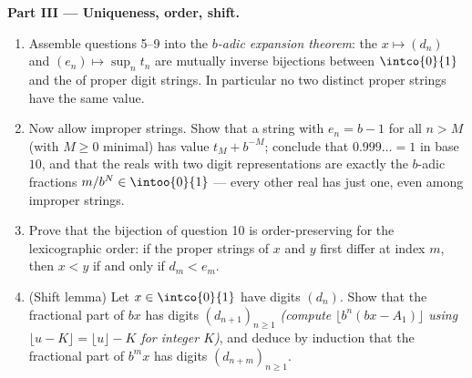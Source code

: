 \begin{problem}
\medskip
\noindent\textbf{Part III --- Uniqueness, order, shift.}
\begin{enumerate}[resume]
  \item Assemble questions 5--9 into the \emph{$b$-adic expansion
        theorem}: the  $x \mapsto (d_n)$ and $(e_n) \mapsto
        \sup_n t_n$ are mutually inverse bijections between
        $\intco{0}{1}$ and the  of proper digit strings. In
        particular no two distinct proper strings have the same
        value.
  \item Now allow improper strings. Show that a string with $e_n
        = b - 1$ for all $n > M$ (with $M \geq 0$ minimal) has
        value $t_M + b^{-M}$; conclude that $0.999\dots = 1$ in
        base $10$, and that the reals with two digit
        representations are exactly the $b$-adic fractions
        $m/b^N \in \intoo{0}{1}$ --- every other real has just
        one, even among improper strings.
  \item Prove that the bijection of question 10 is
        order-preserving for the lexicographic order: if the
        proper strings of $x$ and $y$ first differ at index $m$,
        then $x < y$ if and only if $d_m < e_m$.
  \item (Shift lemma) Let $x \in \intco{0}{1}$ have digits
        $(d_n)$. Show that the fractional part of $bx$ has digits
        $(d_{n+1})_{n \geq 1}$ \emph{(compute $\lfloor b^n(bx -
        A_1)\rfloor$ using $\lfloor u - K \rfloor = \lfloor u
        \rfloor - K$ for integer $K$)}, and deduce by induction
        that the fractional part of $b^m x$ has digits
        $(d_{n+m})_{n \geq 1}$.
\end{enumerate}


\end{problem}

